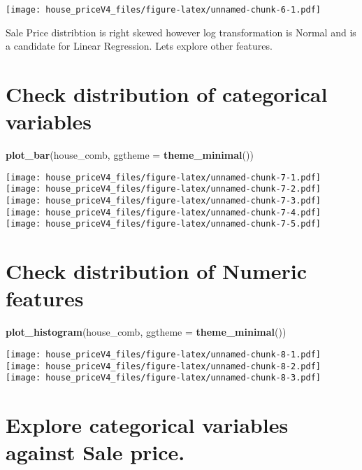 \documentclass[
]{article}
\newenvironment{Shaded}{\begin{snugshade}}{\end{snugshade}}
\newcommand{\DataTypeTok}[1]{\textcolor[rgb]{0.13,0.29,0.53}{#1}}
\newcommand{\KeywordTok}[1]{\textcolor[rgb]{0.13,0.29,0.53}{\textbf{#1}}}
\newcommand{\NormalTok}[1]{#1}
\begin{document}
\texttt{[image: house\_priceV4\_files/figure-latex/unnamed-chunk-6-1.pdf]}

Sale Price distribtion is right skewed however log transformation is
Normal and is a candidate for Linear Regression. Lets explore other
features.

\hypertarget{check-distribution-of-categorical-variables}{%
\section{Check distribution of categorical
variables}\label{check-distribution-of-categorical-variables}}

\begin{Shaded}
\begin{Highlighting}[]
\KeywordTok{plot_bar}\NormalTok{(house_comb, }\DataTypeTok{ggtheme =} \KeywordTok{theme_minimal}\NormalTok{())}
\end{Highlighting}
\end{Shaded}

\texttt{[image: house\_priceV4\_files/figure-latex/unnamed-chunk-7-1.pdf]}
\texttt{[image: house\_priceV4\_files/figure-latex/unnamed-chunk-7-2.pdf]}
\texttt{[image: house\_priceV4\_files/figure-latex/unnamed-chunk-7-3.pdf]}
\texttt{[image: house\_priceV4\_files/figure-latex/unnamed-chunk-7-4.pdf]}
\texttt{[image: house\_priceV4\_files/figure-latex/unnamed-chunk-7-5.pdf]}

\hypertarget{check-distribution-of-numeric-features}{%
\section{Check distribution of Numeric
features}\label{check-distribution-of-numeric-features}}

\begin{Shaded}
\begin{Highlighting}[]
\KeywordTok{plot_histogram}\NormalTok{(house_comb, }\DataTypeTok{ggtheme =} \KeywordTok{theme_minimal}\NormalTok{())}
\end{Highlighting}
\end{Shaded}

\texttt{[image: house\_priceV4\_files/figure-latex/unnamed-chunk-8-1.pdf]}
\texttt{[image: house\_priceV4\_files/figure-latex/unnamed-chunk-8-2.pdf]}
\texttt{[image: house\_priceV4\_files/figure-latex/unnamed-chunk-8-3.pdf]}

\hypertarget{explore-categorical-variables-against-sale-price.}{%
\section{Explore categorical variables against Sale
price.}\label{explore-categorical-variables-against-sale-price.}}
\end{document}
